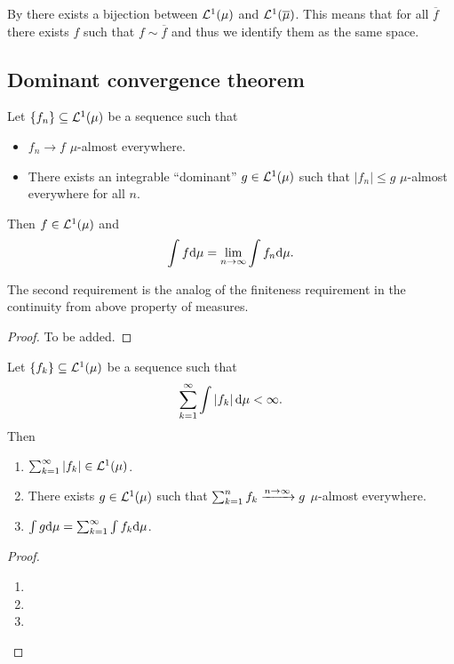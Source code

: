 \documentclass[11pt,a4paper]{article}
\begin{document}
\begin{remark}
  By  there exists a bijection between
  $\mathcal{L}^1(\mu)$ and $\mathcal{L}^1(\overline \mu)$.
  This means that for all $\overline f$ there exists $f$ such that
  $f \sim \overline f$ and thus we identify them as the same space.
\end{remark}

\subsection{Dominant convergence theorem}

\begin{theorem}
  Let $\left\{f_n\right\} \subseteq \mathcal{L}^1(\mu)$ be a sequence such that
  \begin{itemize}
    \item $f_n \to f$ $\mu$-almost everywhere.
    \item There exists an integrable ``dominant'' $g \in \mathcal{L}^1(\mu)$ such that
      $|f_n| \le g$ $\mu$-almost everywhere for all $n$.
  \end{itemize}
  Then $f \in \mathcal{L}^1(\mu)$ and
  \[
    \int f \mathrm{d} \mu =
    \lim_{n \to \infty} \int f_n \mathrm{d} \mu.
  \]
\end{theorem}
\begin{remark}
  The second requirement is the analog of the finiteness requirement
  in the continuity from above property of measures.
\end{remark}
\begin{proof}
  To be added.
\end{proof}

\begin{proposition}
  Let $\left\{f_k\right\} \subseteq \mathcal{L}^1(\mu)$ be a sequence such that
  \[
    \sum_{k=1}^{\infty} \int \left\lvert f_k\right\rvert \mathrm{d} \mu < \infty.
  \]
  Then
  \begin{enumerate}
    \item[(1)] $\sum_{k=1}^{\infty} \left\lvert f_k\right\rvert \in \mathcal{L}^1(\mu)$.
    \item[(2)] There exists $g \in \mathcal{L}^1(\mu)$ such that
      $\sum_{k=1}^{n} f_k \xrightarrow{n \to \infty} g$ $\mu$-almost everywhere.
    \item[(3)] $\int g \mathrm{d} \mu = \sum_{k=1}^{\infty} \int f_k \mathrm{d} \mu$.
  \end{enumerate}
\end{proposition}
\begin{proof} \phantom{}
\begin{enumerate}
  \item[(1)]
  \item[(2)]
  \item[(3)]
\end{enumerate}
\end{proof}
\end{document}
